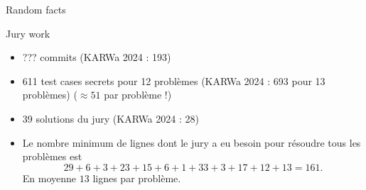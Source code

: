
\begin{frame}{Random facts}
    \begin{block}{Jury work}
      \begin{itemize}[<+->]
        \item ??? commits (KARWa 2024 : 193)
        \item 611 test cases secrets pour 12 problèmes (KARWa 2024 : 693 pour 13 problèmes) ($\approx 51$ par problème !)
        \item 39 solutions du jury (KARWa 2024 : 28)
        \item Le nombre minimum de lignes dont le jury a eu besoin pour résoudre tous les problèmes est
        \[ 29+6+3+23+15+6+1+33+3+17+12+13 = 161. \]
        En moyenne $13$ lignes par problème.
      \end{itemize}
    \end{block}
\end{frame}

